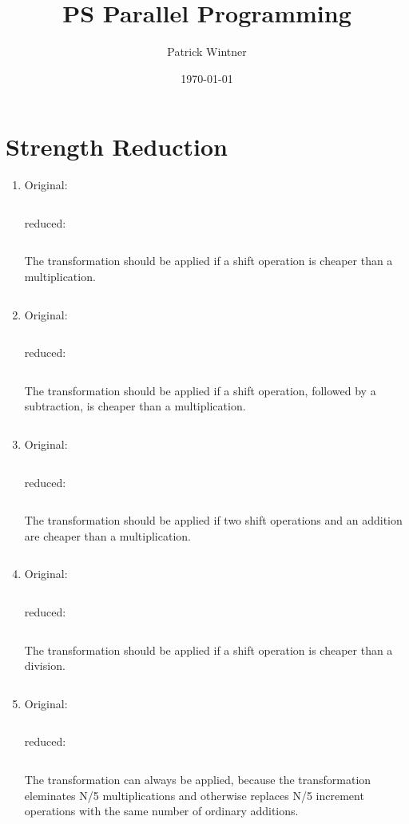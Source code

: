 \documentclass[parskip]{scrartcl}
\title{PS Parallel Programming}
\author{Patrick Wintner}
\date{\today}
\begin{document}
	\maketitle
	
	\section{Strength Reduction}
	\begin{enumerate}[label=\alph*)]
		\item Original: \inputminted[linenos,breaklines]{c}{ex1/a.c}
		
		reduced: \inputminted[linenos,breaklines]{c}{ex1/a_reduced.c}
		
		The transformation should be applied if a shift operation is cheaper than a multiplication.
		
		\inputminted[linenos,breaklines]{gas}{ex1/a.S}
		
		\item Original: \inputminted[linenos,breaklines]{c}{ex1/b.c}
		reduced: \inputminted[linenos,breaklines]{c}{ex1/b_reduced.c}
		
		The transformation should be applied if a shift operation, followed by a subtraction, is cheaper than a multiplication.
		
		\inputminted[linenos,breaklines]{gas}{ex1/b.S}
		
		\item Original: \inputminted[linenos,breaklines]{c}{ex1/c.c}
		reduced: \inputminted[linenos,breaklines]{c}{ex1/c_reduced.c}
		
		The transformation should be applied if two shift operations and an addition are cheaper than a multiplication.
		
		\inputminted[linenos,breaklines]{gas}{ex1/c.S}
		
		\item Original: \inputminted[linenos,breaklines]{c}{ex1/d.c}
		reduced: \inputminted[linenos,breaklines]{c}{ex1/d_reduced.c}
		
		The transformation should be applied if a shift operation is cheaper than a division.
		
		\inputminted[linenos,breaklines]{gas}{ex1/d.S}
		
		\item Original: \inputminted[linenos,breaklines]{c}{ex1/e.c}
		reduced: \inputminted[linenos,breaklines]{c}{ex1/e_reduced.c}
		
		The transformation can always be applied, because the transformation eleminates N/5 multiplications and otherwise replaces N/5 increment operations with the same number of ordinary additions.
		

\end{enumerate}
\end{document}
